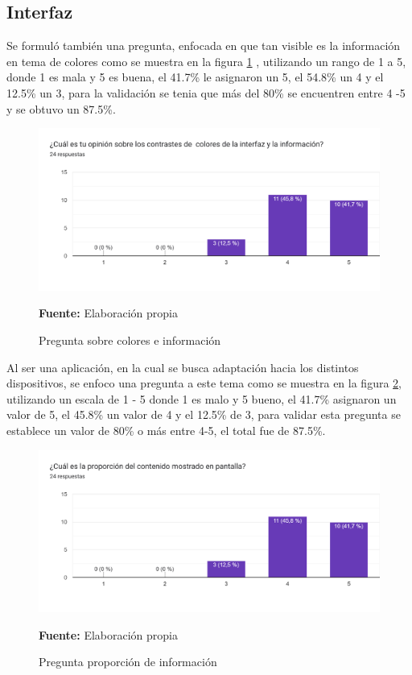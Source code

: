 \documentclass[12pt,twocolumn,a4paper]{article}
\begin{document}
\subsection{Interfaz}

Se formuló también una pregunta, enfocada en que tan visible es la información en tema de colores como se muestra en la figura \ref{Encuesta4} , utilizando un rango de 1 a 5, donde 1 es mala y 5 es buena, el 41.7\% le asignaron un 5, el 54.8\% un 4 y el 12.5\% un 3, para la validación se tenia que más del 80\% se encuentren entre 4 -5 y se obtuvo un 87.5\%.

\begin{figure}
	\centering
	\includegraphics[scale=0.2]{Encuesta4.png}
	\caption{Pregunta sobre colores e información} \textbf{Fuente:} Elaboración propia 
	\label{Encuesta4}
\end{figure}

Al ser una aplicación, en la cual se busca adaptación hacia los distintos dispositivos, se enfoco una pregunta a este tema como se muestra en la figura \ref{Encuesta5}, utilizando un escala de 1 - 5 donde 1 es malo y 5 bueno, el 41.7\% asignaron un valor de 5, el 45.8\% un valor de 4 y el 12.5\% de 3, para validar esta pregunta se establece  un valor de 80\% o más entre 4-5, el total fue de 87.5\%.

\begin{figure}
	\centering
	\includegraphics[scale=0.2]{Encuesta5.png}
	\caption{Pregunta proporción de información} \textbf{Fuente:} Elaboración propia 
	\label{Encuesta5}
\end{figure}
\end{document}
